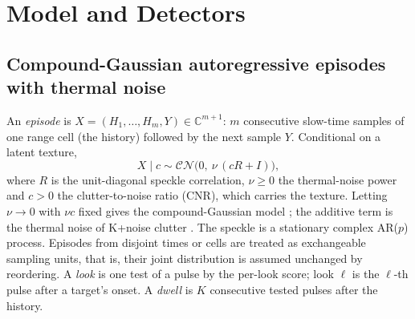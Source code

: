 \documentclass[journal]{IEEEtran}
\begin{document}
\section{Model and Detectors}\label{sec:model}
\subsection{Compound-Gaussian autoregressive episodes with thermal noise}
An \emph{episode} is $X=(H_1,\dots,H_m,Y)\in\mathbb{C}^{m+1}$: $m$ consecutive slow-time samples of one range cell (the history) followed by the next sample $Y$. Conditional on a latent texture,
\begin{equation}
X\mid c\sim\mathcal{CN}\big(0,\ \nu\,(cR+I)\big),
\label{eq:r7model}
\end{equation}
where $R$ is the unit-diagonal speckle correlation, $\nu\ge0$ the thermal-noise power and $c>0$ the clutter-to-noise ratio (CNR), which carries the texture. Letting $\nu\to0$ with $\nu c$ fixed gives the compound-Gaussian model \cite{conte1995,ollila2012}; the additive term is the thermal noise of K+noise clutter \cite{watts1987,ward2013}. The speckle is a stationary complex AR($p$) process. Episodes from disjoint times or cells are treated as exchangeable sampling units, that is, their joint distribution is assumed unchanged by reordering. A \emph{look} is one test of a pulse by the per-look score; look $\ell$ is the $\ell$-th pulse after a target's onset. A \emph{dwell} is $K$ consecutive tested pulses after the history.
\end{document}
